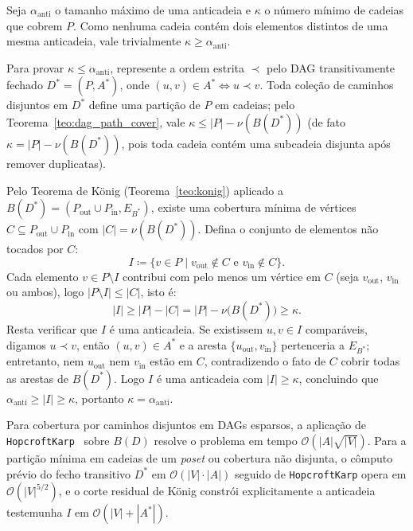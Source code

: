 \begin{demonstracao}
Seja $\alpha_{\text{anti}}$ o tamanho máximo de uma anticadeia e $\kappa$ o número mínimo de cadeias que cobrem $P$. Como nenhuma cadeia contém dois elementos distintos de uma mesma anticadeia, vale trivialmente $\kappa \ge \alpha_{\text{anti}}$.

Para provar $\kappa \le \alpha_{\text{anti}}$, represente a ordem estrita $\prec$ pelo DAG transitivamente fechado $D^* = (P, A^*)$, onde $(u, v) \in A^* \iff u \prec v$. Toda coleção de caminhos disjuntos em $D^*$ define uma partição de $P$ em cadeias; pelo Teorema~\ref{teo:dag_path_cover}, vale $\kappa \le |P| - \nu(B(D^*))$ (de fato $\kappa = |P| - \nu(B(D^*))$, pois toda cadeia contém uma subcadeia disjunta após remover duplicatas).

Pelo Teorema de König (Teorema~\ref{teo:konig}) aplicado a $B(D^*) = (P_{\text{out}} \cup P_{\text{in}}, E_{B^*})$, existe uma cobertura mínima de vértices $C \subseteq P_{\text{out}} \cup P_{\text{in}}$ com $|C| = \nu(B(D^*))$. Defina o conjunto de elementos não tocados por $C$:
\begin{equation*}
    I \coloneqq \bigl\{ v \in P \mid v_{\text{out}} \notin C \text{ e } v_{\text{in}} \notin C \bigr\}.
\end{equation*}
Cada elemento $v \in P \setminus I$ contribui com pelo menos um vértice em $C$ (seja $v_{\text{out}}$, $v_{\text{in}}$ ou ambos), logo $|P \setminus I| \le |C|$, isto é:
\begin{equation*}
    |I| \ge |P| - |C| = |P| - \nu\bigl(B(D^*)\bigr) \ge \kappa.
\end{equation*}
Resta verificar que $I$ é uma anticadeia. Se existissem $u, v \in I$ comparáveis, digamos $u \prec v$, então $(u, v) \in A^*$ e a aresta $\{u_{\text{out}}, v_{\text{in}}\}$ pertenceria a $E_{B^*}$; entretanto, nem $u_{\text{out}}$ nem $v_{\text{in}}$ estão em $C$, contradizendo o fato de $C$ cobrir todas as arestas de $B(D^*)$. Logo $I$ é uma anticadeia com $|I| \ge \kappa$, concluindo que $\alpha_{\text{anti}} \ge |I| \ge \kappa$, portanto $\kappa = \alpha_{\text{anti}}$.
\end{demonstracao}

 Para cobertura por caminhos disjuntos em DAGs esparsos, a aplicação de \lstinline{HopcroftKarp}~\cite{hopcroft1973n52} sobre $B(D)$ resolve o problema em tempo $\mathcal{O}(|A| \sqrt{|V|})$. Para a partição mínima em cadeias de um \textit{poset} ou cobertura não disjunta, o cômputo prévio do fecho transitivo $D^*$ em $\mathcal{O}(|V| \cdot |A|)$ seguido de \lstinline{HopcroftKarp} opera em $\mathcal{O}(|V|^{5/2})$, e o corte residual de König constrói explicitamente a anticadeia testemunha $I$ em $\mathcal{O}(|V| + |A^*|)$.


